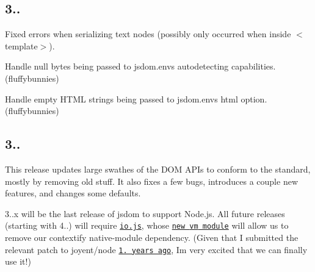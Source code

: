 \subsection*{3..}


\begin{DoxyItemize}
\item Fixed errors when serializing text nodes (possibly only occurred when inside {\ttfamily $<$template$>$}).
\item Handle null bytes being passed to {\ttfamily jsdom.\+env}\textquotesingle{}s autodetecting capabilities. (fluffybunnies)
\item Handle empty H\+T\+ML strings being passed to {\ttfamily jsdom.\+env}\textquotesingle{}s {\ttfamily html} option. (fluffybunnies)
\end{DoxyItemize}

\subsection*{3..}

This release updates large swathes of the D\+OM A\+P\+Is to conform to the standard, mostly by removing old stuff. It also fixes a few bugs, introduces a couple new features, and changes some defaults.

3..\+x will be the last release of jsdom to support Node.\+js. All future releases (starting with 4..) will require \href{https://iojs.org/}{\tt io.\+js}, whose \href{https://github.com/iojs/io.js/blob/v1.x/CHANGELOG.md#vm}{\tt new {\ttfamily vm} module} will allow us to remove our contextify native-\/module dependency. (Given that I submitted the relevant patch to joyent/node \href{https://github.com/joyent/node/commit/7afdba6e0bc3b69c2bf5fdbd59f938ac8f7a64c5}{\tt 1. years ago}, I\textquotesingle{}m very excited that we can finally use it!)


